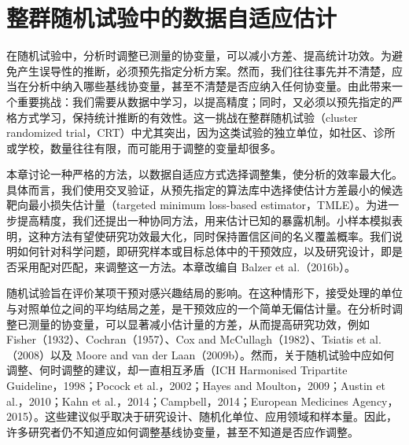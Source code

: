 \chapter{整群随机试验中的数据自适应估计}
\label{ch:data-adaptive-cluster-randomized-trials}

在随机试验中，分析时调整已测量的协变量，可以减小方差、提高统计功效。为避免产生误导性的推断，必须预先指定分析方案。然而，我们往往事先并不清楚，应当在分析中纳入哪些基线协变量，甚至不清楚是否应纳入任何协变量。由此带来一个重要挑战：我们需要从数据中学习，以提高精度；同时，又必须以预先指定的严格方式学习，保持统计推断的有效性。这一挑战在整群随机试验（cluster randomized trial，CRT）中尤其突出，因为这类试验的独立单位，如社区、诊所或学校，数量往往有限，而可能用于调整的变量却很多。

\begin{sourcebox}
本章讨论一种严格的方法，以数据自适应方式选择调整集，使分析的效率最大化。具体而言，我们使用交叉验证，从预先指定的算法库中选择使估计方差最小的候选靶向最小损失估计量（targeted minimum loss-based estimator，TMLE）。为进一步提高精度，我们还提出一种协同方法，用来估计已知的暴露机制。小样本模拟表明，这种方法有望使研究功效最大化，同时保持置信区间的名义覆盖概率。我们说明如何针对科学问题，即研究样本或目标总体中的干预效应，以及研究设计，即是否采用配对匹配，来调整这一方法。本章改编自 Balzer et al.（2016b）。
\end{sourcebox}

随机试验旨在评价某项干预对感兴趣结局的影响。在这种情形下，接受处理的单位与对照单位之间的平均结局之差，是干预效应的一个简单无偏估计量。在分析时调整已测量的协变量，可以显著减小估计量的方差，从而提高研究功效，例如 Fisher（1932）、Cochran（1957）、Cox and McCullagh（1982）、Tsiatis et al.（2008）以及 Moore and van der Laan（2009b）。然而，关于随机试验中应如何调整、何时调整的建议，却一直相互矛盾（ICH Harmonised Tripartite Guideline，1998；Pocock et al.，2002；Hayes and Moulton，2009；Austin et al.，2010；Kahn et al.，2014；Campbell，2014；European Medicines Agency，2015）。这些建议似乎取决于研究设计、随机化单位、应用领域和样本量。因此，许多研究者仍不知道应如何调整基线协变量，甚至不知道是否应作调整。

